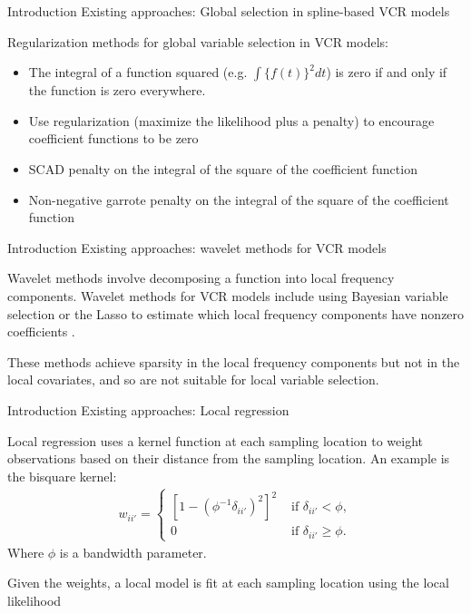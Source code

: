 \documentclass[12pt,t,handout]{beamer}
\newcommand{\subt}[1]{{\footnotesize \color{subtitle} {#1}}}
\begin{document}
\begin{frame}{Introduction}
\subt{Existing approaches: Global selection in spline-based VCR models}

\bigskip
Regularization methods for global variable selection in VCR models:
\begin{itemize}
    \item The integral of a function squared (e.g. $\int \{f(t)\}^2 dt$) is zero if and only if the function is zero everywhere.
    \item Use regularization (maximize the likelihood plus a penalty) to encourage coefficient functions to be zero
    \item SCAD penalty \citep{Fan:2001} on the integral of the square of the coefficient function \citep{Wang:2008a}
    \item Non-negative garrote penalty \citep{Breiman:1995} on the integral of the square of the coefficient function \citep{Antoniadis:2012b}
\end{itemize}

\end{frame}




\begin{frame}{Introduction}
\subt{Existing approaches: wavelet methods for VCR models}

\bigskip
Wavelet methods involve decomposing a function into local frequency components. Wavelet methods for VCR models include using Bayesian variable selection or the Lasso to estimate which local frequency components have nonzero coefficients \citep{Shang-2011,Zhang-2011}.

\vspace{10mm}

These methods achieve sparsity in the local frequency components but not in the local covariates, and so are not suitable for local variable selection.

\note{}
\end{frame}




\begin{frame}{Introduction}
\subt{Existing approaches: Local regression}

\bigskip
Local regression uses a kernel function at each sampling location to weight observations based on their distance from the sampling location. An example is the bisquare kernel:
\begin{align}
	w_{ii'} = \begin{cases} \left[1-\left(\phi^{-1}\delta_{ii'}\right)^2\right]^2 &\mbox{ if } \delta_{ii'} < \phi, \\ 0 &\mbox{ if } \delta_{ii'} \geq \phi. \end{cases}
\end{align}
Where $\phi$ is a bandwidth parameter.

Given the weights, a local model is fit at each sampling location using the local likelihood \citep{Loader:1999}

\note{}
\end{frame}
\end{document}
